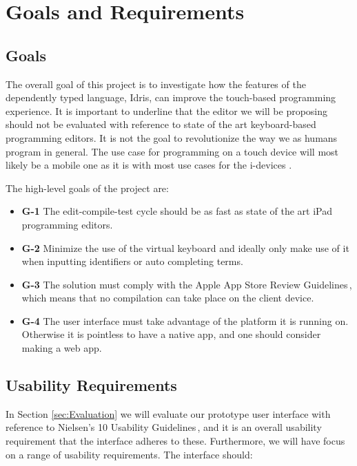 \section{Goals and Requirements}
\label{sec:GoalsAndRequirements}

\subsection{Goals} The overall goal of this project is to investigate how the
features of the dependently typed language, Idris, can improve the touch-based
programming experience. It is important to underline that the editor we will be
proposing should not be evaluated with reference to state of the art keyboard-based programming editors. It is not the goal to revolutionize the way we as
humans program in general. The use case for programming on a touch device will most likely be a
mobile one as it is with most use cases for the i-devices \cite[p. 26]{nielsen2013mobile}.

The high-level goals of the project are:

\begin{itemize} 
	\item \textbf{G-1} The edit-compile-test cycle should be as fast as state of the art iPad 
	programming editors.
	\item \textbf{G-2} Minimize the use of the virtual keyboard\cite[pp. 76]{nielsen2013mobile} and
	ideally only make use of it when inputting identifiers or auto completing terms.
	\item \textbf{G-3} The solution must comply with the Apple App Store Review 
	Guidelines\,\cite{AppStoreGuidelines}, which means that no compilation can take place on 
	the client device.
	\item \textbf{G-4} The user interface must take advantage of the platform it is running on. 
	Otherwise it is pointless to have a native app, and one should consider making a web app.
\end{itemize}

\subsection{Usability Requirements} 
In Section \ref{sec:Evaluation} we will evaluate our prototype user interface with reference to Nielsen's 10 Usability
Guidelines\,\cite{nielsen1990heuristic}, and it is an overall usability
requirement that the interface adheres to these. Furthermore, we will have focus on a range of
usability requirements. The interface should:

